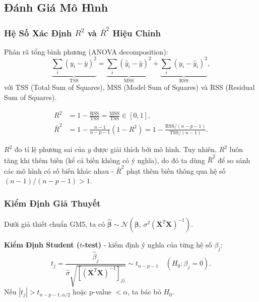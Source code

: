 ﻿\subsection{Đánh Giá Mô Hình}


\subsubsection{Hệ Số Xác Định $R^2$ và $\bar{R}^2$ Hiệu Chỉnh}

Phân rã tổng bình phương (ANOVA decomposition):
\begin{equation}
    \underbrace{\sum_i (y_i - \bar{y})^2}_{\mathrm{TSS}}
    = \underbrace{\sum_i (\hat{y}_i - \bar{y})^2}_{\mathrm{MSS}}
    + \underbrace{\sum_i (y_i - \hat{y}_i)^2}_{\mathrm{RSS}},
\end{equation}
với TSS (Total Sum of Squares), MSS (Model Sum of Squares) và RSS
(Residual Sum of Squares).

\begin{tcolorbox}[mycodebox, colback=blue!3!white, colframe=blue!40!black,
    title={\textbf{Định nghĩa 1.3} - Hệ Số Xác Định}]
\begin{align}
    R^2 &= 1 - \frac{\mathrm{RSS}}{\mathrm{TSS}}
         = \frac{\mathrm{MSS}}{\mathrm{TSS}} \in [0, 1],
    \label{eq:r2} \\
    \bar{R}^2 &= 1 - \frac{n-1}{n-p-1}(1 - R^2)
               = 1 - \frac{\mathrm{RSS}/(n-p-1)}{\mathrm{TSS}/(n-1)}.
    \label{eq:r2_adj}
\end{align}
\end{tcolorbox}

$R^2$ đo tỉ lệ phương sai của $y$ được giải thích bởi mô hình. Tuy nhiên,
$R^2$ luôn tăng khi thêm biến (kể cả biến không có ý nghĩa), do đó ta dùng
$\bar{R}^2$ để so sánh các mô hình có số biến khác nhau - $\bar{R}^2$ phạt
thêm biến thông qua hệ số $(n-1)/(n-p-1) > 1$.

\subsubsection{Kiểm Định Giả Thuyết}

Dưới giả thiết chuẩn GM5, ta có
$\hat{\boldsymbol{\beta}} \sim \mathcal{N}(\boldsymbol{\beta},\,
\sigma^2(\mathbf{X}^T\mathbf{X})^{-1})$.

\medskip
\noindent\textbf{Kiểm Định Student ($t$-test)} - kiểm định ý nghĩa của
từng hệ số $\beta_j$:
\begin{equation}
    t_j = \frac{\hat{\beta}_j}{\hat{\sigma}\sqrt{[(\mathbf{X}^T\mathbf{X})^{-1}]_{jj}}}
        \sim t_{n-p-1}
    \quad (H_0 : \beta_j = 0).
    \label{eq:t_test}
\end{equation}
Nếu $|t_j| > t_{n-p-1, \alpha/2}$ hoặc p-value $< \alpha$, ta bác bỏ $H_0$.

